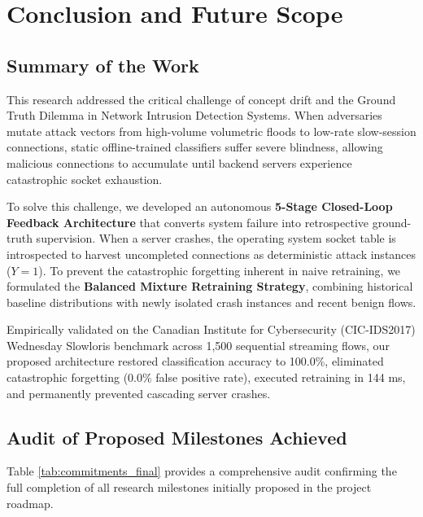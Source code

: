 \documentclass[12pt,a4paper,oneside]{report}
\begin{document}
\chapter{Conclusion and Future Scope}
\label{chap:conclusion}

\section{Summary of the Work}
This research addressed the critical challenge of concept drift and the Ground Truth Dilemma in Network Intrusion Detection Systems. When adversaries mutate attack vectors from high-volume volumetric floods to low-rate slow-session connections, static offline-trained classifiers suffer severe blindness, allowing malicious connections to accumulate until backend servers experience catastrophic socket exhaustion.

To solve this challenge, we developed an autonomous \textbf{5-Stage Closed-Loop Feedback Architecture} that converts system failure into retrospective ground-truth supervision. When a server crashes, the operating system socket table is introspected to harvest uncompleted connections as deterministic attack instances ($Y=1$). To prevent the catastrophic forgetting inherent in naive retraining, we formulated the \textbf{Balanced Mixture Retraining Strategy}, combining historical baseline distributions with newly isolated crash instances and recent benign flows.

Empirically validated on the Canadian Institute for Cybersecurity (CIC-IDS2017) Wednesday Slowloris benchmark across 1,500 sequential streaming flows, our proposed architecture restored classification accuracy to 100.0\%, eliminated catastrophic forgetting (0.0\% false positive rate), executed retraining in 144 ms, and permanently prevented cascading server crashes.

\section{Audit of Proposed Milestones Achieved}
Table \ref{tab:commitments_final} provides a comprehensive audit confirming the full completion of all research milestones initially proposed in the project roadmap.
\end{document}
